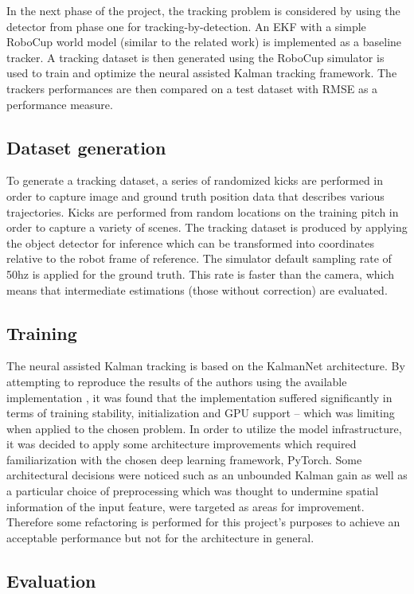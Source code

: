 \documentclass[a4paper,twoside,12pt]{report}
\begin{document}
In the next phase of the project, the tracking problem is considered by using the detector from phase one for tracking-by-detection. An EKF with a simple RoboCup world model (similar to the related work) is implemented as a baseline tracker. A tracking dataset is then generated using the RoboCup simulator is used to train and optimize the neural assisted Kalman tracking framework. The trackers performances are then compared on a test dataset with RMSE as a performance measure.

\subsection{Dataset generation}

To generate a tracking dataset, a series of randomized kicks are performed in order to capture image and ground truth position data that describes various trajectories. Kicks are performed from random locations on the training pitch in order to capture a variety of scenes. The tracking dataset is produced by applying the object detector for inference which can be transformed into coordinates relative to the robot frame of reference. The simulator default sampling rate of 50hz is applied for the ground truth. This rate is faster than the camera, which means that intermediate estimations (those without correction) are evaluated.

\subsection{Training}
The neural assisted Kalman tracking is based on the KalmanNet architecture. By attempting to reproduce the results of the authors using the available implementation \cite{kalmangit}, it was found that the implementation suffered significantly in terms of training stability, initialization and GPU support -- which was limiting when applied to the chosen problem. In order to utilize the model infrastructure, it was decided to apply some architecture improvements which required familiarization with the chosen deep learning framework, PyTorch. Some architectural decisions were noticed such as an unbounded Kalman gain as well as a particular choice of preprocessing which was thought to undermine spatial information of the input feature, were targeted as areas for improvement. Therefore some refactoring is performed for this project's purposes to achieve an acceptable performance but not for the architecture in general.

\subsection{Evaluation}
\end{document}
